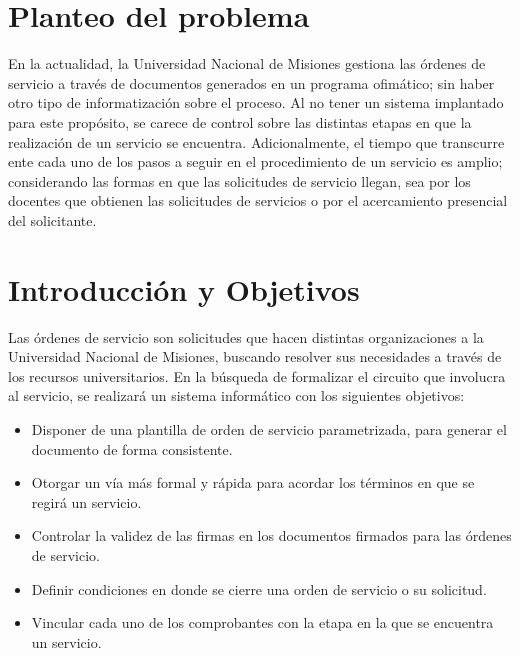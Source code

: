 \section*{Planteo del problema}
\normalsize{ \indent
En la actualidad, la Universidad Nacional de Misiones
gestiona las \'ordenes de servicio a trav\'es de
documentos generados en un programa ofim\'atico;
sin haber otro tipo de informatizaci\'on sobre
el proceso. Al no tener un sistema implantado para
este prop\'osito, se carece de control sobre las
distintas etapas en que la realizaci\'on de un
servicio se encuentra.
}
\newline
\normalsize{ \indent
Adicionalmente, el tiempo que transcurre ente cada
uno de los pasos a seguir en el procedimiento de un
servicio es amplio; considerando las formas en que
las solicitudes de servicio llegan, sea por los
docentes que obtienen las solicitudes de servicios
o por el acercamiento presencial del solicitante.
}
\section*{Introducci\'on y Objetivos}
\normalsize{ \indent
Las \'ordenes de servicio son solicitudes que
hacen distintas organizaciones a la Universidad
Nacional de Misiones, buscando resolver sus
necesidades a trav\'es de los recursos
universitarios. En la b\'usqueda de formalizar
el circuito que involucra al servicio, se
realizar\'a un sistema inform\'atico con los
siguientes objetivos:
}
\begin{itemize}
	\item Disponer de una plantilla de orden
	de servicio parametrizada, para generar
	el documento de forma consistente.
	\item Otorgar un v\'ia m\'as formal y
	r\'apida para acordar los t\'erminos
	en que se regir\'a un servicio.
	\item Controlar la validez de las firmas
	en los documentos firmados para las
	\'ordenes de servicio.
	\item Definir condiciones en donde se
	cierre una orden de servicio o su
	solicitud.
	\item Vincular cada uno de los
	comprobantes con la etapa en la que se
	encuentra un servicio.
\end{itemize}
